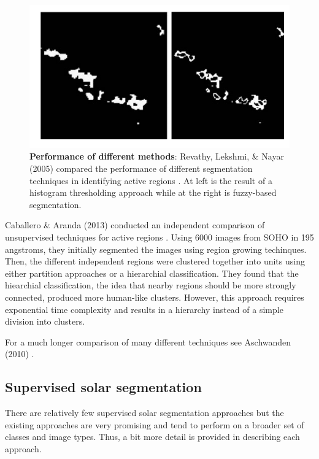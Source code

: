 \documentclass[twoside]{report}
\begin{document}
\begin{figure}[H]
  \begin{center}
    \includegraphics[scale=1]{revathy.png}
    \caption{{\bf Performance of different methods}: Revathy, Lekshmi, \& Nayar (2005) compared the performance of different segmentation techniques in identifying active regions \cite{revathy}. At left is the result of a histogram thresholding approach while at the right is fuzzy-based segmentation. }
    \label{fig:revathy}
 \end{center}
\end{figure}

Caballero \& Aranda (2013) conducted an independent comparison of unsupervised techniques for active regions \cite{caballero}. Using 6000 images from SOHO in 195 angstroms, they initially segmented the images using region growing techinques. Then, the different independent regions were clustered together into units using either partition approaches or a hierarchial classification. They found that the hiearchial classification, the idea that nearby regions should be more strongly connected, produced more human-like clusters. However, this approach requires exponential time complexity and results in a hierarchy instead of a simple division into clusters.

For a much longer comparison of many different techniques see Aschwanden (2010) \cite{aschwanden:2010}. 

\subsection{Supervised solar segmentation} \label{sec:supervised}
There are relatively few supervised solar segmentation approaches but the existing approaches are very promising and tend to perform on a broader set of classes and image types. Thus, a bit more detail is provided in describing each approach. 
\end{document}
